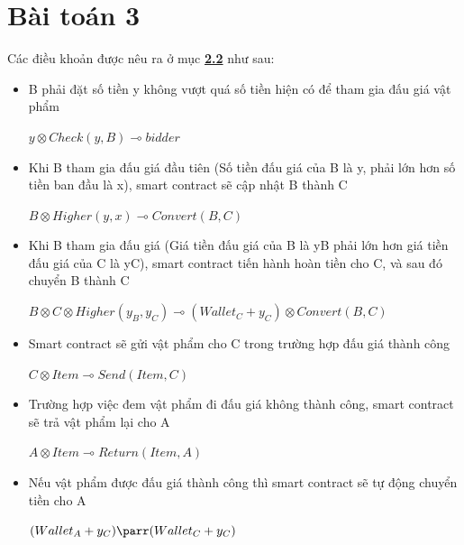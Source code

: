 \documentclass[a4paper]{article}
\begin{document}
\section{Bài toán 3}
Các điều khoản được nêu ra ở mục \hyperref[dieukhoan]{\textbf{2.2}} như sau:
\begin{itemize}
    \item B phải đặt số tiền y không vượt quá số tiền hiện có để tham gia đấu giá vật phẩm\\
    \begin{center}
        $y \otimes Check(y,B) \multimap bidder$
    \end{center}
    
    \item Khi B tham gia đấu giá đầu tiên (Số tiền đấu giá của B là y, phải lớn hơn số tiền ban đầu là x), smart contract sẽ cập nhật B thành C\\
    \begin{center}
        $B \otimes Higher(y,x) \multimap Convert(B, C)$
    \end{center}
    
    \item Khi B tham gia đấu giá (Giá tiền đấu giá của B là yB phải lớn hơn giá tiền đấu giá của C là yC), smart contract tiến hành hoàn tiền cho C, và sau đó chuyển B thành C\\
    \begin{center}
        $B \otimes C \otimes Higher(y_{B}, y_{C}) \multimap (Wallet_{C} + y_{C}) \otimes Convert(B,C)$
    \end{center}
    
    \item Smart contract sẽ gửi vật phẩm cho C trong trường hợp đấu giá thành công\\
    \begin{center}
        $C \otimes Item \multimap Send(Item,C)$
    \end{center}
    
    \item Trường hợp việc đem vật phẩm đi đấu giá không thành công, smart contract sẽ trả vật phẩm lại cho A\\
    \begin{center}
        $A \otimes Item \multimap Return(Item,A)$
    \end{center}
    
    \item Nếu vật phẩm được đấu giá thành công thì smart contract sẽ tự động chuyển tiền cho A\\
    \begin{center}
        $(Wallet_{A} + y_{C}) \parr (Wallet_{C} + y_{C})$
    \end{center}
    

\end{itemize}
\end{document}
